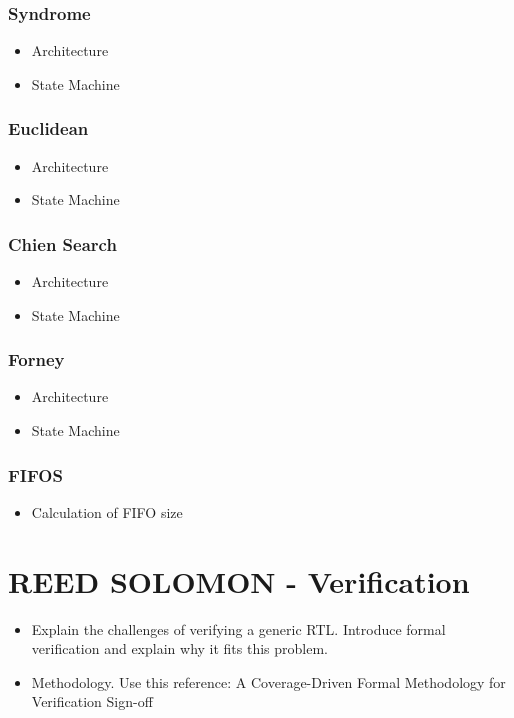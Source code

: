 \documentclass[conference]{IEEEtran}
\begin{document}
\subsubsection{Syndrome}
\begin{itemize}
	\item Architecture
	\item State Machine
\end{itemize}
\subsubsection{Euclidean}
\begin{itemize}
	\item Architecture
	\item State Machine
\end{itemize}
\subsubsection{Chien Search}
\begin{itemize}
	\item Architecture
	\item State Machine
\end{itemize}
\subsubsection{Forney}
\begin{itemize}
	\item Architecture
	\item State Machine
\end{itemize} 
 \subsubsection{FIFOS}
\begin{itemize}
	\item Calculation of FIFO size
\end{itemize} 
 
\section{REED SOLOMON - Verification}
\begin{itemize}
	\item Explain the challenges of verifying a generic RTL. Introduce formal verification and explain why it fits this problem. 
	\item Methodology. Use this reference: A Coverage-Driven Formal Methodology for Verification Sign-off \end{itemize}
\end{document}
